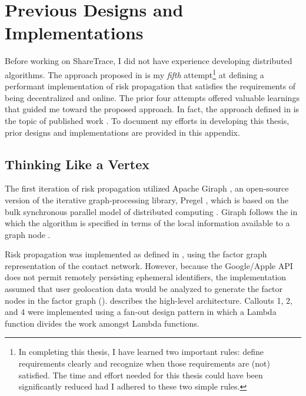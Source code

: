 \chapter{Previous Designs and Implementations}\label{sec:previous-designs}

Before working on ShareTrace, I did not have experience developing distributed algorithms. The approach proposed in  is my \emph{fifth} attempt\footnote{In completing this thesis, I have learned two important rules: define requirements clearly and recognize when those requirements are (not) satisfied. The time and effort needed for this thesis could have been significantly reduced had I adhered to these two simple rules.} at defining a performant implementation of risk propagation that satisfies the requirements of being decentralized and online. The prior four attempts offered valuable learnings that guided me toward the proposed approach. In fact, the approach defined in  is the topic of published work \cite{Tatton2022}. To document my efforts in developing this thesis, prior designs and implementations are provided in this appendix.

\section{Thinking Like a Vertex}\label{sec:giraph}

The first iteration of risk propagation \cite{Tatton2020} utilized Apache Giraph \cite{Giraph2020}, an open-source version of the iterative graph-processing library, Pregel \cite{Malewicz2010}, which is based on the bulk synchronous parallel model of distributed computing \cite{Valiant1990}. Giraph follows the  in which the algorithm is specified in terms of the local information available to a graph node \cite{McCune2015}.

Risk propagation was implemented as defined in \cite{Ayday2020,Ayday2021}, using the factor graph representation of the contact network. However, because the Google/Apple API does not permit remotely persisting ephemeral identifiers, the implementation assumed that user geolocation data would be analyzed to generate the factor nodes in the factor graph ().  describes the high-level architecture. Callouts 1, 2, and 4 were implemented using a fan-out design pattern in which a  Lambda function divides the work amongst  Lambda functions.

